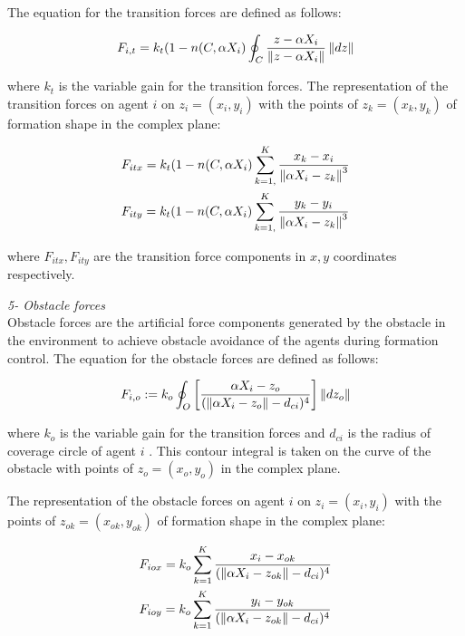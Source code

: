 The equation for the transition forces are defined as follows:	
				
\begin{equation}
F_{i,t} = k_t (1-n(C,\alpha X_i) \oint_C \frac{z-\alpha X_i}{\left\lVert z-\alpha X_i\right\rVert}\left\lVert dz\right\rVert
\end{equation}
				
where $k_t$ is the variable gain for the transition forces. The representation of the transition forces on agent $i$ on $z_i = (x_i, y_i)$ with the points of  $z_k = (x_k,y_k)$ of formation shape in the complex plane:
			
\begin{align*}
&F_{itx} = k_t  (1-n(C,\alpha X_i) \sum_{k=1,}^{K}\frac{x_k- x_i}{\left\lVert\alpha X_i - z_k\right\rVert^3}\\
&F_{ity} = k_t  (1-n(C,\alpha X_i) \sum_{k=1,}^{K}\frac{y_k- y_i}{\left\lVert\alpha X_i - z_k\right\rVert^3}\\
\end{align*}
			
where  $F_{itx} , F_{ity} $ are the transition force components in $x,y$ coordinates respectively. \newline
			
\textit{			5- Obstacle forces} \\ 
Obstacle forces are the artificial force components generated by the obstacle in the environment to achieve obstacle avoidance of the agents during formation control. 	
The equation for the obstacle forces are defined as follows:	
			
\begin{equation}
F_{i,o} := k_o  \oint_O \left[\frac{\alpha X_i - z_o}{(\left\lVert\alpha X_i - z_o\right\rVert - d_{ci})^4}\right] \left\lVert dz_o\right\rVert
\end{equation}
			
where $k_o$ is the variable gain for the transition forces and $d_{ci}$ is the radius of coverage circle of agent $i$ . This contour integral is taken on the curve of the obstacle with  points of $z_o = (x_o,y_o)$ in the complex plane.
			
The representation of the obstacle forces on agent $i$ on $z_i = (x_i, y_i)$ with the points of  $z_{ok} = (x_{ok},y_{ok})$ of formation shape in the complex plane:
			
\begin{align*}
& F_{iox} = k_o   \sum_{k=1}^{K} \frac{x_i -x_{ok}}{(\left\lVert\alpha X_i - z_{ok}\right\rVert -d_{ci})^4}\\
& F_{ioy} = k_o   \sum_{k=1}^{K} \frac{y_i - y_{ok}}{(\left\lVert\alpha X_i - z_{ok}\right\rVert -d_{ci})^4}\\
\end{align*}
			
